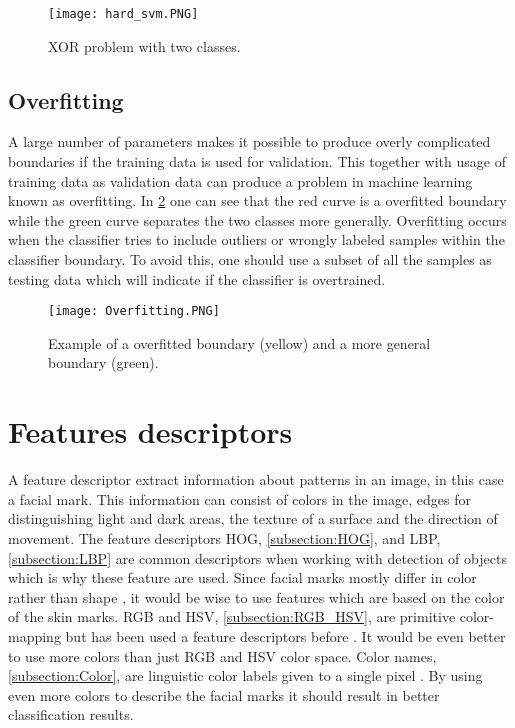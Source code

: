 \FloatBarrier
\begin{figure}[!h]
	\centering
	\texttt{[image: hard\_svm.PNG]}
	\caption{XOR problem with two classes. 
		\label{fig:hard_class}}
\end{figure} 
\FloatBarrier

\subsection{Overfitting}

A large number of parameters makes it possible to produce overly complicated boundaries if the training data is used for validation. This together with usage of training data as validation data can produce a problem in machine learning known as overfitting. In \cref{fig:overfitting} one can see that the red curve is a overfitted boundary while the green curve separates the two classes more generally. Overfitting occurs when the classifier tries to include outliers or wrongly labeled samples within the classifier boundary. To avoid this, one should use a subset of all the samples as testing data which will indicate if the classifier is overtrained. 

\FloatBarrier
\begin{figure}[!h]
	\centering
	\texttt{[image: Overfitting.PNG]}
	\caption{Example of a overfitted boundary (yellow) and a more general boundary (green). 
		\label{fig:overfitting}}
\end{figure} 
\FloatBarrier

\section{Features descriptors} \label{sec:features}

A feature descriptor extract information about patterns in an image, in this case a facial mark. This information can consist of colors in the image, edges for distinguishing light and dark areas, the texture of a surface and the direction of movement. The feature descriptors HOG, \cref{subsection:HOG}, and LBP, \cref{subsection:LBP} are common descriptors when working with detection of objects \cite{pedestrian_detection,vehicle_hog,facedetection_LBP} which is why these feature are used. Since facial marks mostly differ in color rather than shape \cite{torso_RPPVSM}, it would be wise to use features which are based on the color of the skin marks. RGB and HSV, \cref{subsection:RGB_HSV}, are primitive color-mapping but has been used a feature descriptors before \cite{torso_RPPVSM}. It would be even better to use more colors than just RGB and HSV color space. Color names, \cref{subsection:Color}, are linguistic color labels given to a single pixel \cite{11_colours}. By using even more colors to describe the facial marks it should result in better classification results. 

